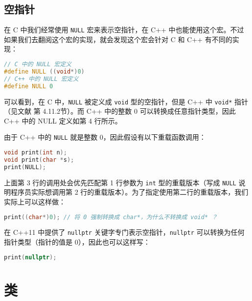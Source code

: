\documentclass[hyperref,UTF8]{article}
\begin{document}
\subsection{空指针}

在 C 中我们经常使用 \texttt{NULL} 宏来表示空指针，在 C++ 中也能使用这个宏。不过如果我们去翻阅这个宏的实现，就会发现这个宏会针对 C 和 C++ 有不同的实现：
\begin{lstlisting}[language=c++]
// C 中的 NULL 宏定义
#define NULL ((void*)0)
// C++ 中的 NULL 宏定义
#define NULL 0
\end{lstlisting}
可以看到，在 C 中，\texttt{NULL} 被定义成 \texttt{void} 型的空指针，但是 C++ 中 \texttt{void*} 指针（见文献 \cite{Lippman2013C} 第 4.11.2节）。而 C++ 中的整数 0 可以转换成任意指针类型，因此 C++ 中的 NULL 定义如第 4 行所示。

由于 C++ 中的 \texttt{NULL} 就是整数 0，因此假设有以下重载函数调用：
\begin{lstlisting}[language=c++]
void print(int n);
void print(char *s);
print(NULL);
\end{lstlisting}
上面第 3 行的调用处会优先匹配第 1 行参数为 \texttt{int} 型的重载版本（写成 \texttt{NULL} 说明程序员实际想调用第 2 行的重载版本）。为了指定使用第二行的重载版本，我们实际上可以这样做：
\begin{lstlisting}[language=c++,numbers=none]
print((char*)0); // 将 0 强制转换成 char*，为什么不转换成 void* ？
\end{lstlisting}
在 C++11 中提供了 \texttt{nullptr} 关键字专门表示空指针，\texttt{nullptr} 可以转换为任何指针类型（指针的值是 0），因此也可以这样写：
\begin{lstlisting}[language=c++,numbers=none,style=c++11]
print(nullptr);
\end{lstlisting}

\section{类}
\end{document}
